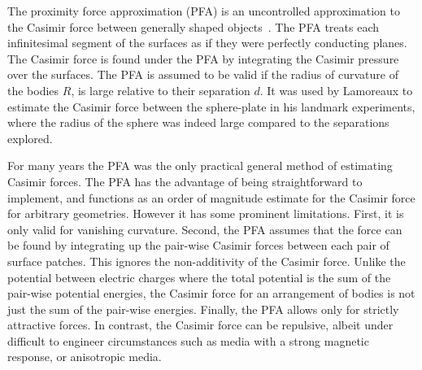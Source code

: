 The proximity force approximation (PFA) is an uncontrolled approximation to
the Casimir force between generally shaped objects~\cite{Derjaguin1956}.  
The PFA treats each infinitesimal segment of the surfaces as if they were perfectly conducting planes.
The Casimir force is found under the PFA by integrating the Casimir pressure over the surfaces.
The PFA is assumed to be valid if the radius of curvature of the bodies $R$, is large relative to 
their separation $d$.  It was used by Lamoreaux to estimate the Casimir force between the sphere-plate
in his landmark experiments, where the radius of the sphere was indeed large compared to the separations explored. 

For many years the PFA was the only practical general method of estimating Casimir forces.
The PFA has the advantage of being straightforward to implement, and functions as an order of magnitude
estimate for the Casimir force for arbitrary geometries.
  However it has some prominent limitations.
  First, it is only valid for vanishing curvature.
 Second, the PFA assumes that the force can be found by integrating up
 the pair-wise Casimir forces between each pair of surface patches.  This ignores the non-additivity
of the Casimir force.  Unlike the potential between electric charges where the total potential is
the sum of the pair-wise potential energies, the Casimir force for an arrangement
of bodies is not just the sum of the pair-wise energies.  
Finally, the PFA allows only for strictly attractive forces.  
In contrast, the Casimir force can be repulsive, albeit under difficult to engineer circumstances 
such as media with a strong magnetic response, or anisotropic media.


